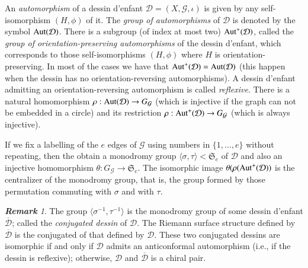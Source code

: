 \documentclass[12pt]{amsart}
\theoremstyle{remark}
\newtheorem{rema}{\bf Remark}
\begin{document}
An {\it automorphism} of a dessin d'enfant ${\mathcal D}=(X,{\mathcal G},\iota)$ is given by any self-isomorphism $(H,\phi)$ of it.
The {\it group of automorphisms} of ${\mathcal D}$ is denoted by the symbol ${\rm Aut}({\mathcal D})$. 
There is a subgroup (of index at most two) ${\rm Aut}^{+}({\mathcal D})$, called the {\it group of orientation-preserving automorphisms} of the dessin d'enfant, which corresponds to those self-isomorphisms $(H,\phi)$ where $H$ is orientation-preserving. In most of the cases we have that ${\rm Aut}^{+}({\mathcal D})={\rm Aut}({\mathcal D})$ (this happen when the dessin has no orientation-reversing automorphisms). A dessin d'enfant admitting an orientation-reversing automorphism is called {\it reflexive}. There is a natural homomorphism $\rho:{\rm Aut}({\mathcal D}) \to G_{\mathcal G}$ (which is injective if the graph can not be embedded in a circle) and its restriction 
$\rho:{\rm Aut}^{+}({\mathcal D}) \to G_{\mathcal G}$ (which is always injective). 

If we fix a labelling of the $e$ edges of ${\mathcal G}$ using numbers in $\{1,\ldots,e\}$ without repeating, then the obtain a monodromy group $\langle \sigma, \tau \rangle < {\mathfrak S}_{e}$ of ${\mathcal D}$ and also an injective homomorphism
$\theta:G_{\mathcal G} \to {\mathfrak S}_{e}$.  The isomorphic image $\theta(\rho({\rm Aut}^{+}({\mathcal D}))$ is 
the centralizer of the monodromy group, that is, the group formed by those permutation commuting with $\sigma$ and with $\tau$. 

{\vspace{0.3cm}}
\noindent
\begin{rema}
The group $\langle \sigma^{-1},\tau^{-1}\rangle$ is the monodromy group of some dessin d'enfant $\overline{{\mathcal D}}$; called the {\it conjugated dessin} of ${\mathcal D}$. The Riemann surface structure defined by $\overline{{\mathcal D}}$ is the conjugated of that defined by ${\mathcal D}$. These two conjugated dessins are isomorphic if and only if ${\mathcal D}$ admits an anticonformal automorphism (i.e., if the dessin is reflexive); otherwise, ${\mathcal D}$ and $\overline{{\mathcal D}}$ is a chiral pair.
\end{rema}

{\vspace{0.3cm}}
\end{document}
